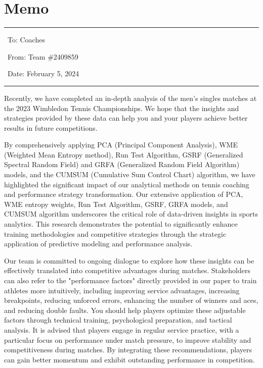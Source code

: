 \documentclass[12pt]{article}%
\newcounter{prefix}  %
\newenvironment{letter}[1]{\refstepcounter{section}\addtocounter{section}{-1}\section*{#1}\addcontentsline{toc}{section}{#1}}{\stepcounter{prefix}}
\begin{document}
	\begin{letter}{Memo}
		\begin{flushleft}  %
			\noindent\rule{\textwidth}{1pt}
			
			\vspace{-0.1cm}
			
			\noindent \ To: Coaches
			
			\vspace{-0.1cm}
			
			\noindent \ From: Team \#2409859
			
			\vspace{-0.1cm}
			
			\noindent \ Date: February 5, 2024
			
			\vspace{-0.2cm}
			
			\noindent\rule{\textwidth}{1pt}
			
			
		\end{flushleft}
		
Recently, we have completed an in-depth analysis of the men's singles matches at the 2023 Wimbledon Tennis Championships. We hope that the insights and strategies provided by these data can help you and your players achieve better results in future competitions.

By comprehensively applying PCA (Principal Component Analysis), WME (Weighted Mean Entropy method), Run Test Algorithm, GSRF (Generalized Spectral Random Field) and GRFA (Generalized Random Field Algorithm) models, and the CUMSUM (Cumulative Sum Control Chart) algorithm, we have highlighted the significant impact of our analytical methods on tennis coaching and performance strategy transformation. Our extensive application of PCA, WME entropy weights, Run Test Algorithm, GSRF, GRFA models, and CUMSUM algorithm underscores the critical role of data-driven insights in sports analytics. This research demonstrates the potential to significantly enhance training methodologies and competitive strategies through the strategic application of predictive modeling and performance analysis.

Our team is committed to ongoing dialogue to explore how these insights can be effectively translated into competitive advantages during matches. Stakeholders can also refer to the "performance factors" directly provided in our paper to train athletes more intuitively, including improving service advantages, increasing breakpoints, reducing unforced errors, enhancing the number of winners and aces, and reducing double faults. You should help players optimize these adjustable factors through technical training, psychological preparation, and tactical analysis. It is advised that players engage in regular service practice, with a particular focus on performance under match pressure, to improve stability and competitiveness during matches. By integrating these recommendations, players can gain better momentum and exhibit outstanding performance in competition.


\end{letter}
\end{document}
